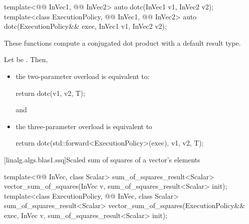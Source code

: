 \begin{itemdecl}
template<@@ InVec1, @@ InVec2>
  auto dotc(InVec1 v1, InVec2 v2);
template<class ExecutionPolicy, @@ InVec1, @@ InVec2>
  auto dotc(ExecutionPolicy&& exec,
            InVec1 v1, InVec2 v2);
\end{itemdecl}

\begin{itemdescr}

\pnum
These functions compute a conjugated dot product with a default result type.

\pnum
\effects
Let  be .
Then,
\begin{itemize}
\item
the two-parameter overload is equivalent to:
\begin{codeblock}
return dotc(v1, v2, T{});
\end{codeblock}
and
\item
the three-parameter overload is equivalent to
\begin{codeblock}
return dotc(std::forward<ExecutionPolicy>(exec), v1, v2, T{});
\end{codeblock}
\end{itemize}
\end{itemdescr}

[linalg.algs.blas1.ssq]{Scaled sum of squares of a vector's elements}

\begin{itemdecl}
template<@@ InVec, class Scalar>
  sum_of_squares_result<Scalar> vector_sum_of_squares(InVec v, sum_of_squares_result<Scalar> init);
template<class ExecutionPolicy, @@ InVec, class Scalar>
  sum_of_squares_result<Scalar> vector_sum_of_squares(ExecutionPolicy&& exec,
                                                      InVec v, sum_of_squares_result<Scalar> init);
\end{itemdecl}


